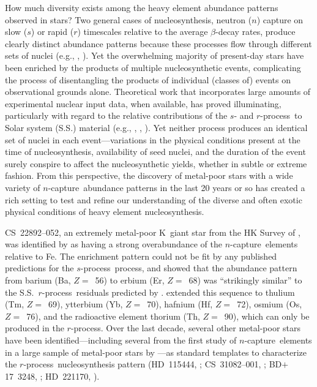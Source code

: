 \documentclass{emulateapj}
\def\rpro{\mbox{$r$-process}}
\def\spro{\mbox{$s$-process}}
\def\ncap{\mbox{$n$-capture}}
\begin{document}
How much diversity exists among the heavy element abundance
patterns observed in stars?
Two general cases of nucleosynthesis, neutron ($n$) capture
on slow ($s$) or rapid ($r$) timescales relative to the 
average $\beta$-decay rates, produce clearly distinct 
abundance patterns because these processes flow through
different sets of nuclei
(e.g., \citealt{burbidge57}, \citealt{cameron57}).
Yet the overwhelming majority of present-day stars have 
been enriched by the products of multiple nucleosynthetic
events, complicating the process of disentangling the
products of individual (classes of) events on
observational grounds alone.
Theoretical work that incorporates large amounts of 
experimental nuclear input data, when available, has proved illuminating,
particularly with regard to the relative contributions of 
the $s$- and \rpro\ to Solar system (S.S.) material
(e.g., \citealt{cameron73}, \citealt{kappeler89}, \citealt{arlandini99}).
Yet neither process produces an identical 
set of nuclei in each event---variations in the physical
conditions present at the time of nucleosynthesis, availability
of seed nuclei, and the duration of the event surely conspire to 
affect the nucleosynthetic yields, whether in subtle or extreme fashion.
From this perspective, 
the discovery of metal-poor stars with a wide variety 
of \ncap\ abundance patterns in the last 20 years or so has
created a rich setting to test and refine our
understanding of the
diverse and often exotic physical conditions of 
heavy element nucleosynthesis.

\mbox{CS~22892--052},
an extremely metal-poor K~giant 
star from the HK Survey of \citet{beers92}, was identified 
by \citet{sneden94} as having a 
strong overabundance of the \ncap\ elements relative to Fe.  
The enrichment pattern could not be fit by any published 
predictions for the \spro\ process, and \citet{cowan95} showed that 
the abundance pattern from barium (Ba, $Z =$~56) to erbium 
(Er, $Z =$~68) was ``strikingly similar'' to the S.S.\ \rpro\
residuals predicted by \citet{kappeler89}.
\citet{sneden96} extended this sequence to 
thulium (Tm, $Z =$~69), 
ytterbium (Yb, $Z =$~70), 
hafnium (Hf, $Z =$~72), 
osmium (Os, $Z =$~76), and the radioactive element
thorium (Th, $Z =$~90), which can only be produced in the \rpro.
Over the last decade, several other metal-poor stars have 
been identified---including
several from the first study of \ncap\ elements in a large sample
of metal-poor stars by \citet{gilroy88}---as 
standard templates to characterize the \rpro\ 
nucleosynthesis pattern
(\mbox{HD~115444}, \citealt{westin00};
\mbox{CS~31082--001}, \citealt{hill02};
\mbox{BD$+$17~3248}, \citealt{cowan02};
\mbox{HD~221170}, \citealt{ivans06}).
\end{document}
